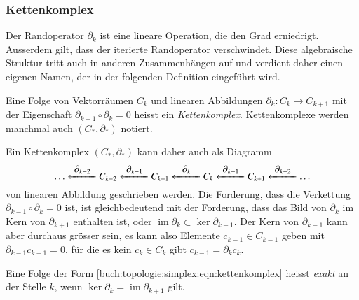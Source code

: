 %
%
\subsubsection{Kettenkomplex}
Der Randoperator $\partial_k$ ist eine lineare Operation, die den Grad 
erniedrigt.
Ausserdem gilt, dass der iterierte Randoperator verschwindet.
Diese algebraische Struktur tritt auch in anderen Zusammenhängen
auf und verdient daher einen eigenen Namen, der in der folgenden
Definition eingeführt wird.

\begin{definition}[Kettenkomplex]
Eine Folge von Vektorräumen $C_k$ und linearen Abbildungen
$\partial_k\colon C_k\to C_{k+1}$
mit der Eigenschaft $\partial_{k-1}\circ\partial_k=0$ heisst
ein \emph{Kettenkomplex}.
%
Kettenkomplexe werden manchmal auch $(C_*,\partial_*)$ notiert.
\end{definition}

Ein Kettenkomplex $(C_*,\partial_*)$ kann daher auch als Diagramm
\begin{equation}
\dots
\xleftarrow{\;\quad\clap{$\partial_{k-2}$}\quad\;}
C_{k-2}
\xleftarrow{\;\quad\clap{$\partial_{k-1}$}\quad\;}
C_{k-1}
\xleftarrow{\;\quad\clap{$\partial_{k}$}\quad\;}
C_k
\xleftarrow{\;\quad\clap{$\partial_{k+1}$}\quad\;}
C_{k+1}
\xleftarrow{\;\quad\clap{$\partial_{k+2}$}\quad\;}
\dots
\label{buch:topologie:simplex:eqn:kettenkomplex}
\end{equation}
von linearen Abbildung geschrieben werden.
Die Forderung, dass die Verkettung $\partial_{k-1}\circ\partial_k=0$
ist, ist gleichbedeutend mit der Forderung, dass das Bild von $\partial_k$
im Kern von $\partial_{k+1}$ enthalten ist, oder
$\operatorname{im}\partial_k \subset \ker\partial_{k-1}$.
Der Kern von $\partial_{k-1}$ kann aber durchaus grösser sein, es kann
also Elemente $c_{k-1}\in C_{k-1}$ geben mit $\partial_{k-1} c_{k-1}=0$,
für die es kein $c_k\in C_k$ gibt $c_{k-1}=\partial_kc_k$.

\begin{definition}
Eine Folge der Form
\eqref{buch:topologie:simplex:eqn:kettenkomplex}
heisst \emph{exakt} an der Stelle $k$, wenn
$\ker\partial_{k} = \operatorname{im}\partial_{k+1}$
gilt.
\end{definition}

